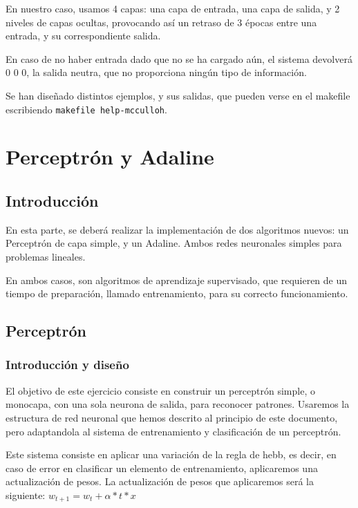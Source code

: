 \documentclass[12pt]{article}
\begin{document}
En nuestro caso, usamos 4 capas: una capa de entrada, una capa de salida, y 2 niveles de capas ocultas, provocando así un retraso de 3 épocas entre una entrada, y su correspondiente salida.

En caso de no haber entrada dado que no se ha cargado aún, el sistema devolverá 0 0 0, la salida neutra, que no proporciona ningún tipo de información.

Se han diseñado distintos ejemplos, y sus salidas, que pueden verse en el makefile escribiendo \texttt{makefile help-mcculloh}.

\newpage

\section{Perceptrón y Adaline}
\subsection*{Introducción}
En esta parte, se deberá realizar la implementación de dos algoritmos nuevos: un Perceptrón de capa simple, y un Adaline. Ambos redes neuronales simples para problemas lineales.

En ambos casos, son algoritmos de aprendizaje supervisado, que requieren de un tiempo de preparación, llamado entrenamiento, para su correcto funcionamiento.

\subsection{Perceptrón}

\subsubsection{Introducción y diseño}

El objetivo de este ejercicio consiste en construir un perceptrón simple, o monocapa, con una sola neurona de salida, para reconocer patrones. Usaremos la estructura de red neuronal que hemos descrito al principio de este documento, pero adaptandola al sistema de entrenamiento y clasificación de un perceptrón.

Este sistema consiste en aplicar una variación de la regla de hebb, es decir, en caso de error en clasificar un elemento de entrenamiento, aplicaremos una actualización de pesos. La actualización de pesos que aplicaremos será la siguiente:
$w_{t+1}=w_{t}+ \alpha*t*x$
\end{document}
